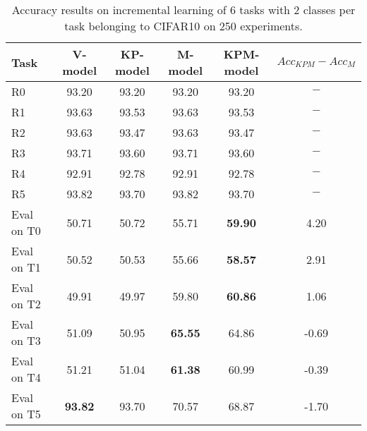 \begin{table}[H]
\centering
\begin{tabular}{lccccc}
\toprule
Task  & V-model & KP-model & M-model & KPM-model & $Acc_{KPM}-Acc_{M}$ \\
\midrule
R0 & 93.20 & 93.20 & 93.20 & 93.20 & $-$ \\
R1 & 93.63 & 93.53 & 93.63 & 93.53 & $-$ \\
R2 & 93.63 & 93.47 & 93.63 & 93.47 & $-$ \\
R3 & 93.71 & 93.60 & 93.71 & 93.60 & $-$ \\
R4 & 92.91 & 92.78 & 92.91 & 92.78 & $-$ \\
R5 & 93.82 & 93.70 & 93.82 & 93.70 & $-$ \\

 \hline 
Eval on T0 & 50.71 & 50.72 & 55.71 & \textbf{59.90} & 4.20 \\
Eval on T1 & 50.52 & 50.53 & 55.66 & \textbf{58.57} & 2.91 \\
Eval on T2 & 49.91 & 49.97 & 59.80 & \textbf{60.86} & 1.06 \\
Eval on T3 & 51.09 & 50.95 & \textbf{65.55} & 64.86 & -0.69 \\
Eval on T4 & 51.21 & 51.04 & \textbf{61.38} & 60.99 & -0.39 \\
Eval on T5 & \textbf{93.82} & 93.70 & 70.57 & 68.87 & -1.70 \\
\bottomrule
\end{tabular}
\caption{Accuracy results on incremental learning of 6 tasks with 2 classes per task belonging to CIFAR10 on 250 experiments.}
\end{table}
